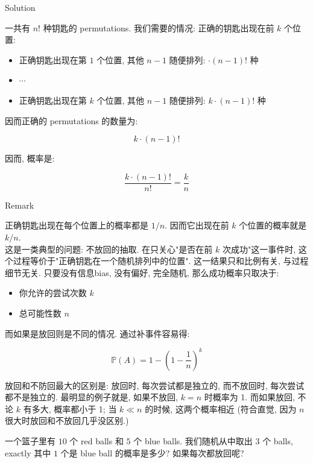 \documentclass{qlnotes-export}
\begin{document}
\begin{qlsolution}{Solution}

一共有 \(n!\) 种钥匙的 permutations. 我们需要的情况: 正确的钥匙出现在前 \(k\) 个位置:

\begin{itemize}
\item
  正确钥匙出现在第 \(1\) 个位置, 其他 \(n - 1\) 随便排列: \(\cdot (n - 1)!\) 种
\item
  \(\cdots\)
\item
  正确钥匙出现在第 \(k\) 个位置, 其他 \(n - 1\) 随便排列: \(k \cdot (n - 1)!\) 种
\end{itemize}

因而正确的 permutations 的数量为:

\[k \cdot (n - 1)!\]

因而, 概率是:

\[\frac{k \cdot (n - 1)!}{n!} = \frac{k}{n}\]

\end{qlsolution}

\begin{qlremark}{Remark}

正确钥匙出现在每个位置上的概率都是 \(1/n\). 因而它出现在前 \(k\) 个位置的概率就是 \(k/n\).\\
这是一类典型的问题: 不放回的抽取. 在只关心"是否在前 \(k\) 次成功"这一事件时, 这个过程等价于"正确钥匙在一个随机排列中的位置". 这一结果只和比例有关, 与过程细节无关. 只要没有信息bias, 没有偏好, 完全随机, 那么成功概率只取决于:

\begin{itemize}
\item
  你允许的尝试次数 \(k\)
\item
  总可能性数 \(n\)
\end{itemize}

而如果是放回则是不同的情况. 通过补事件容易得:

\[{\mathbb{P}}(A) = 1 - \left( {1 - \frac{1}{n}} \right)^{k}\]

放回和不防回最大的区别是: 放回时, 每次尝试都是独立的, 而不放回时, 每次尝试都不是独立的. 最明显的例子就是, 如果不放回, \(k = n\) 时概率为 1. 而如果放回, 不论 \(k\) 有多大, 概率都小于 1; 当 \(k \ll n\) 的时候, 这两个概率相近 (符合直觉, 因为 \(n\) 很大时放回和不放回几乎没区别.)

\end{qlremark}

\begin{example}

一个篮子里有 \(10\) 个 red balls 和 \(5\) 个 blue balls. 我们随机从中取出 \(3\) 个 balls, exactly 其中 \(1\) 个是 blue ball 的概率是多少? 如果每次都放回呢?

\end{example}
\end{document}
